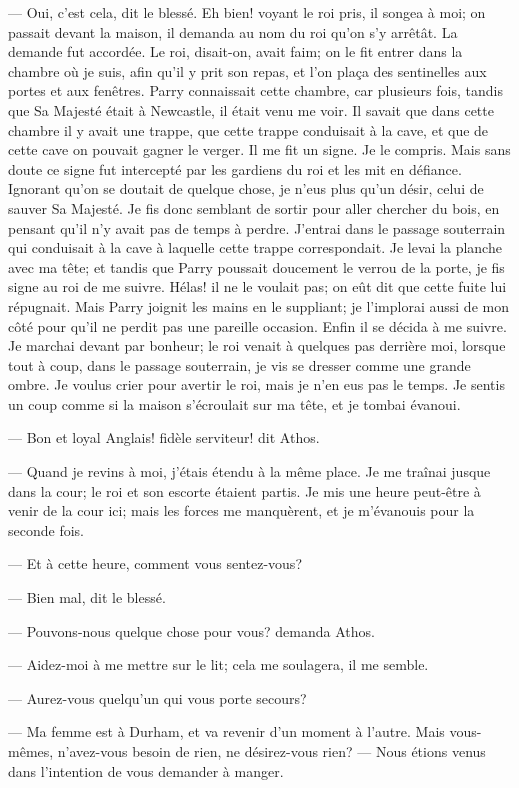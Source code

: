 — Oui, c'est cela, dit le blessé. Eh bien! voyant le roi pris, il songea à moi; on passait devant la maison, il demanda au nom du roi qu'on s'y arrêtât. La demande fut accordée. Le roi, disait-on, avait faim; on le fit entrer dans la chambre où je suis, afin qu'il y prit son repas, et l'on plaça des sentinelles aux portes et aux fenêtres. Parry connaissait cette chambre, car plusieurs fois, tandis que Sa Majesté était à Newcastle, il était venu me voir. Il savait que dans cette chambre il y avait une trappe, que cette trappe conduisait à la cave, et que de cette cave on pouvait gagner le verger. Il me fit un signe. Je le compris. Mais sans doute ce signe fut intercepté par les gardiens du roi et les mit en défiance. Ignorant qu'on se doutait de quelque chose, je n'eus plus qu'un désir, celui de sauver Sa Majesté. Je fis donc semblant de sortir pour aller chercher du bois, en pensant qu'il n'y avait pas de temps à perdre. J'entrai dans le passage souterrain qui conduisait à la cave à laquelle cette trappe correspondait. Je levai la planche avec ma tête; et tandis que Parry poussait doucement le verrou de la porte, je fis signe au roi de me suivre. Hélas! il ne le voulait pas; on eût dit que cette fuite lui répugnait. Mais Parry joignit les mains en le suppliant; je l'implorai aussi de mon côté pour qu'il ne perdit pas une pareille occasion. Enfin il se décida à me suivre. Je marchai devant par bonheur; le roi venait à quelques pas derrière moi, lorsque tout à coup, dans le passage souterrain, je vis se dresser comme une grande ombre. Je voulus crier pour avertir le roi, mais je n'en eus pas le temps. Je sentis un coup comme si la maison s'écroulait sur ma tête, et je tombai évanoui.

— Bon et loyal Anglais! fidèle serviteur! dit Athos.

— Quand je revins à moi, j'étais étendu à la même place. Je me traînai jusque dans la cour; le roi et son escorte étaient partis. Je mis une heure peut-être à venir de la cour ici; mais les forces me manquèrent, et je m'évanouis pour la seconde fois.

— Et à cette heure, comment vous sentez-vous?

— Bien mal, dit le blessé.

— Pouvons-nous quelque chose pour vous? demanda Athos.

— Aidez-moi à me mettre sur le lit; cela me soulagera, il me semble.

— Aurez-vous quelqu'un qui vous porte secours?

— Ma femme est à Durham, et va revenir d'un moment à l'autre. Mais vous-mêmes, n'avez-vous besoin de rien, ne désirez-vous rien?
— Nous étions venus dans l'intention de vous demander à manger.

